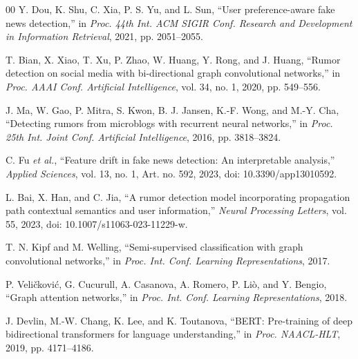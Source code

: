 \documentclass[conference]{IEEEtran}
\begin{document}
\begin{thebibliography}{00}
Y. Dou, K. Shu, C. Xia, P. S. Yu, and L. Sun, ``User preference-aware fake
news detection,'' in \emph{Proc. 44th Int. ACM SIGIR Conf. Research and
Development in Information Retrieval}, 2021, pp. 2051--2055.

T. Bian, X. Xiao, T. Xu, P. Zhao, W. Huang, Y. Rong, and J. Huang, ``Rumor
detection on social media with bi-directional graph convolutional networks,''
in \emph{Proc. AAAI Conf. Artificial Intelligence}, vol. 34, no. 1, 2020,
pp. 549--556.

J. Ma, W. Gao, P. Mitra, S. Kwon, B. J. Jansen, K.-F. Wong, and M.-Y. Cha,
``Detecting rumors from microblogs with recurrent neural networks,'' in
\emph{Proc. 25th Int. Joint Conf. Artificial Intelligence}, 2016,
pp. 3818--3824.

C. Fu \emph{et al.}, ``Feature drift in fake news detection: An interpretable
analysis,'' \emph{Applied Sciences}, vol. 13, no. 1, Art. no. 592, 2023,
doi: 10.3390/app13010592.

L. Bai, X. Han, and C. Jia, ``A rumor detection model incorporating
propagation path contextual semantics and user information,''
\emph{Neural Processing Letters}, vol. 55, 2023, doi:
10.1007/s11063-023-11229-w.

T. N. Kipf and M. Welling, ``Semi-supervised classification with graph
convolutional networks,'' in \emph{Proc. Int. Conf. Learning Representations},
2017.

P. Veli\v{c}kovi\'c, G. Cucurull, A. Casanova, A. Romero, P. Li\`o, and
Y. Bengio, ``Graph attention networks,'' in \emph{Proc. Int. Conf. Learning
Representations}, 2018.

J. Devlin, M.-W. Chang, K. Lee, and K. Toutanova, ``BERT: Pre-training of
deep bidirectional transformers for language understanding,'' in
\emph{Proc. NAACL-HLT}, 2019, pp. 4171--4186.
\end{thebibliography}
\end{document}
